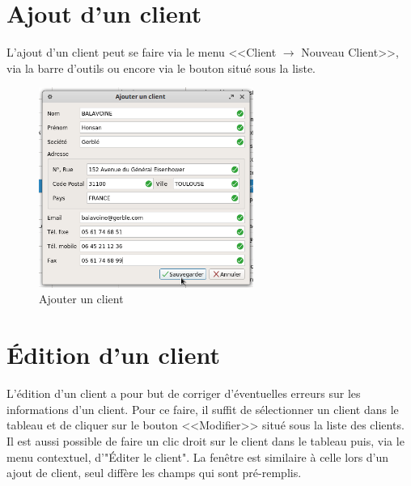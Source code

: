 \section{Ajout d'un client}
L'ajout d’un client peut se faire via le menu <<Client $\rightarrow$ Nouveau Client>>, via la barre d'outils ou encore via le bouton situé sous la
liste. 
\begin{figure}[H]
	\centering
	\includegraphics[width=7cm]{screens/ajouterClient.png}
	\caption{Ajouter un client}
\end{figure}

\section{Édition d'un client}
L’édition d’un client a pour but de corriger d’éventuelles erreurs sur les informations d’un client. Pour ce faire, il suffit de sélectionner
un client dans le tableau et de cliquer sur le bouton <<Modifier>> situé sous la liste des clients. Il est aussi possible de faire un clic droit sur le client dans le tableau puis, via le menu contextuel, d'"Éditer le client".
La fenêtre est similaire à celle lors d’un ajout de client, seul diffère les champs qui sont pré-remplis. 

